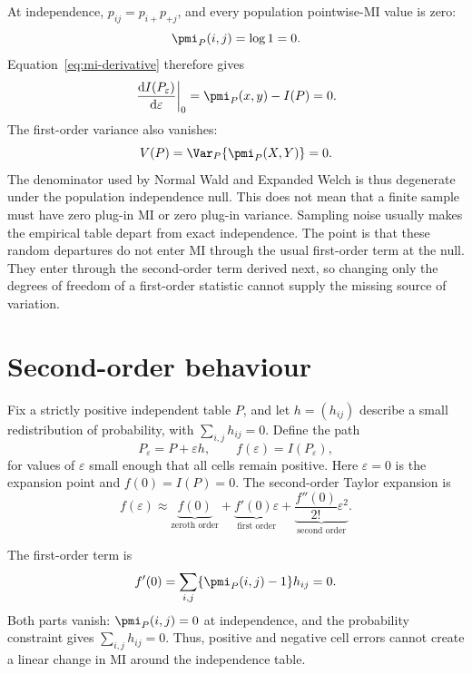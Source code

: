 At independence, $p_{ij}=p_{i+}p_{+j}$, and every population pointwise-MI
value is zero:
\begin{equation}
  \pmi_P(i,j)=\log 1=0.
\end{equation}
Equation~\eqref{eq:mi-derivative} therefore gives
\begin{equation}
  \left.\frac{\mathrm d I(P_\varepsilon)}
  {\mathrm d\varepsilon}\right|_0
  =\pmi_P(x,y)-I(P)=0.
\end{equation}
The first-order variance also vanishes:
\begin{equation}
  V(P)=\Var_P\{\pmi_P(X,Y)\}=0.
\end{equation}
The denominator used by Normal Wald and Expanded Welch is thus
degenerate under the population independence null. This does not mean that a
finite sample must have zero plug-in MI or zero plug-in variance. Sampling
noise usually makes the empirical table depart from exact independence. The
point is that these random departures do not enter MI through the usual
first-order term at the null. They enter through the second-order term derived
next, so changing only the degrees of freedom of a first-order statistic cannot
supply the missing source of variation.

\section{Second-order behaviour}

Fix a strictly positive independent table $P$, and let $h=(h_{ij})$ describe a
small redistribution of probability, with $\sum_{i,j}h_{ij}=0$. Define the path
\begin{equation}
  P_\varepsilon=P+\varepsilon h,
  \qquad
  f(\varepsilon)=I(P_\varepsilon),
  \label{eq:independence-path}
\end{equation}
for values of $\varepsilon$ small enough that all cells remain positive. Here
$\varepsilon=0$ is the expansion point and $f(0)=I(P)=0$. The second-order
Taylor expansion is
\begin{equation}
  f(\varepsilon)
  \approx
  \underbrace{f(0)}_{\text{zeroth order}}
  +\underbrace{f'(0)\varepsilon}_{\text{first order}}
  +\underbrace{\frac{f''(0)}{2!}\varepsilon^2}_{\text{second order}}.
  \label{eq:independence-taylor-template}
\end{equation}

The first-order term is
\begin{equation}
  f'(0)
  =\sum_{i,j}\{\pmi_P(i,j)-1\}h_{ij}=0.
  \label{eq:independence-first-term}
\end{equation}
Both parts vanish: $\pmi_P(i,j)=0$ at independence, and the probability
constraint gives $\sum_{i,j}h_{ij}=0$. Thus, positive and negative cell errors
cannot create a linear change in MI around the independence table.

